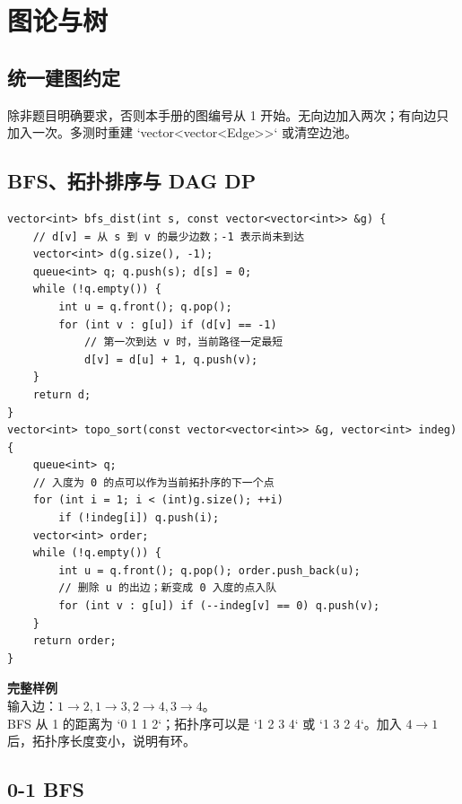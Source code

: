 \chapter{图论与树}

\section{统一建图约定}

除非题目明确要求，否则本手册的图编号从 1 开始。无向边加入两次；有向边只加入一次。多测时重建 `vector<vector<Edge>>` 或清空边池。

\section{BFS、拓扑排序与 DAG DP}


\begin{lstlisting}[style=cpp]
vector<int> bfs_dist(int s, const vector<vector<int>> &g) {
    // d[v] = 从 s 到 v 的最少边数；-1 表示尚未到达
    vector<int> d(g.size(), -1);
    queue<int> q; q.push(s); d[s] = 0;
    while (!q.empty()) {
        int u = q.front(); q.pop();
        for (int v : g[u]) if (d[v] == -1)
            // 第一次到达 v 时，当前路径一定最短
            d[v] = d[u] + 1, q.push(v);
    }
    return d;
}
vector<int> topo_sort(const vector<vector<int>> &g, vector<int> indeg) {
    queue<int> q;
    // 入度为 0 的点可以作为当前拓扑序的下一个点
    for (int i = 1; i < (int)g.size(); ++i)
        if (!indeg[i]) q.push(i);
    vector<int> order;
    while (!q.empty()) {
        int u = q.front(); q.pop(); order.push_back(u);
        // 删除 u 的出边；新变成 0 入度的点入队
        for (int v : g[u]) if (--indeg[v] == 0) q.push(v);
    }
    return order;
}
\end{lstlisting}

\begin{card}
\textbf{完整样例}\\
输入边：\(1\to2,1\to3,2\to4,3\to4\)。\\
BFS 从 1 的距离为 `0 1 1 2`；拓扑序可以是 `1 2 3 4` 或 `1 3 2 4`。加入 \(4\to1\) 后，拓扑序长度变小，说明有环。
\end{card}

\section{0-1 BFS}

